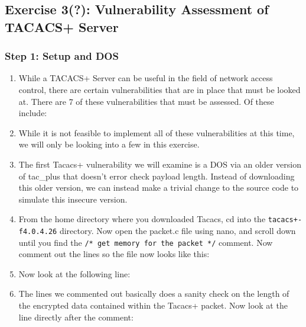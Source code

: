 \documentclass[main.tex]{subfiles}
\begin{document}
\subsection{Exercise 3(?): Vulnerability Assessment of TACACS+ Server}
\begin{itemize}

\subsubsection{Step 1: Setup and DOS}
\begin{enumerate}[noitemsep,label=$\bullet$,leftmargin=20mm,labelsep=0.5cm]    
\item While a TACACS+ Server can be useful in the field of network access control, there are certain vulnerabilities that are in place that must be looked at. There are 7 of these vulnerabilities that must be assessed. Of these include:
\item While it is not feasible to implement all of these vulnerabilities at this time, we will only be looking into a few in this exercise.

\item The first Tacacs+ vulnerability we will examine is a DOS via an older version of tac\_plus that doesn't error check payload length. Instead of downloading this older version, we can instead make a trivial change to the source code to simulate this insecure version.

\item From the home directory where you downloaded Tacacs, cd into the \texttt{tacacs+-f4.0.4.26} directory. Now open the packet.c file using nano, and scroll down until you find the \texttt{/* get memory for the packet */} comment. Now comment out the lines so the file now looks like this:


\item Now look at the following line:



\item The lines we commented out basically does a sanity check on the length of the encrypted data contained within the Tacacs+ packet. Now look at the line directly after the comment:


\end{enumerate}
\end{itemize}
\end{document}
